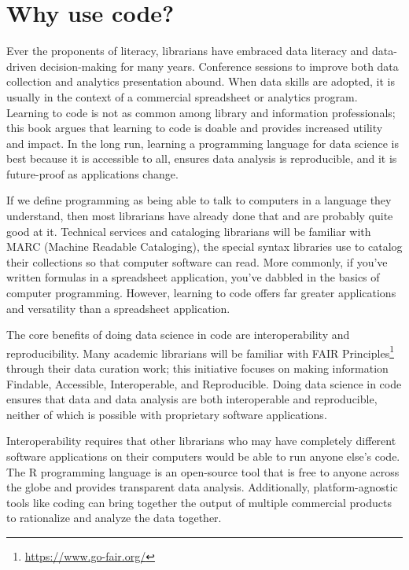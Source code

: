 \documentclass[
  krantz2]{krantz}
\begin{document}
\hypertarget{use-code}{%
\section{Why use code?}\label{use-code}}

Ever the proponents of literacy, librarians have embraced data literacy and data-driven decision-making for many years. Conference sessions to improve both data collection and analytics presentation abound. When data skills are adopted, it is usually in the context of a commercial spreadsheet or analytics program. Learning to code is not as common among library and information professionals; this book argues that learning to code is doable and provides increased utility and impact. In the long run, learning a programming language for data science is best because it is accessible to all, ensures data analysis is reproducible, and it is future-proof as applications change.

If we define programming as being able to talk to computers in a language they understand, then most librarians have already done that and are probably quite good at it. Technical services and cataloging librarians will be familiar with MARC (Machine Readable Cataloging), the special syntax libraries use to catalog their collections so that computer software can read. More commonly, if you've written formulas in a spreadsheet application, you've dabbled in the basics of computer programming. However, learning to code offers far greater applications and versatility than a spreadsheet application.

The core benefits of doing data science in code are interoperability and reproducibility. Many academic librarians will be familiar with FAIR Principles\footnote{\url{https://www.go-fair.org/}} through their data curation work; this initiative focuses on making information Findable, Accessible, Interoperable, and Reproducible. Doing data science in code ensures that data and data analysis are both interoperable and reproducible, neither of which is possible with proprietary software applications.

Interoperability requires that other librarians who may have completely different software applications on their computers would be able to run anyone else's code. The R programming language is an open-source tool that is free to anyone across the globe and provides transparent data analysis. Additionally, platform-agnostic tools like coding can bring together the output of multiple commercial products to rationalize and analyze the data together.
\end{document}
